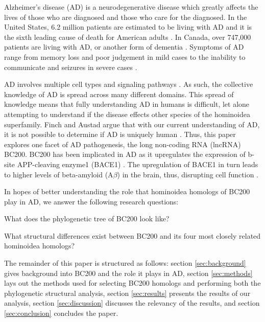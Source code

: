 \documentclass[conference, 11pt]{IEEEtran}
\begin{document}
Alzheimer's disease (AD) is a neurodegenerative disease which greatly affects the lives of those who are diagnosed and those who care for the diagnosed. 
In the United States, 6.2 million patients are estimated to be living with AD and it is the sixth leading cause of death for American adults \cite{AlzheimersDisease}. 
In Canada, over 747,000 patients are living with AD, or another form of dementia \cite{ADcanada}. 
Symptoms of AD range from memory loss and poor judgement in mild cases to the inability to communicate and seizures in severe cases \cite{alzheimersSigns}.

AD involves multiple cell types and signaling pathways \cite{zhang2021role}. As such, the collective knowledge of AD is spread across many different domains. 
This spread of knowledge means that fully understanding AD in humans is difficult, let alone attempting to understand if the disease effects other species of the hominoidea superfamily.
Finch and Austad argue that with our current understanding of AD, it is not possible to determine if AD is uniquely human \cite{finch2015commentary}. 
Thus, this paper explores one facet of AD pathogenesis, the long non-coding RNA (lncRNA) BC200. 
BC200 has been implicated in AD as it upregulates the expression of b-site APP-cleaving enzyme1 (BACE1) \cite{li2018identification,zhang2021role}. 
The upregulation of BACE1 in turn leads to higher levels of beta-amyloid (A$\beta$) in the brain, thus, disrupting cell function \cite{li2018identification,zhang2021role}. 

In hopes of better understanding the role that hominoidea homologs of BC200 play in AD, we answer the following research questions:

\begin{questions}
  \item What does the phylogenetic tree of BC200 look like?
  \item What structural differences exist between BC200 and its four most closely related hominoidea homologs?
\end{questions}

The remainder of this paper is structured as follows: section \ref{sec:background} gives background into BC200 and the role it plays in AD, section \ref{sec:methods} lays out the methods used for selecting BC200 homologs and performing both the phylogenetic structural analysis, section \ref{sec:results} presents the results of our analysis, section \ref{sec:discussion} discusses the relevancy of the results, and section \ref{sec:conclusion} concludes the paper.
\end{document}
